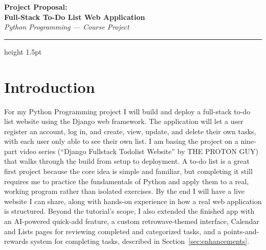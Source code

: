 \documentclass[11pt]{article}
\begin{document}
\begin{flushleft}
{\Huge\bfseries\color{headblue} Project Proposal:\\[2pt] Full-Stack To-Do List Web Application}\\[4pt]
{\itshape\color{gray} Python Programming --- Course Project}
\end{flushleft}
\vspace{2pt}
{\color{rowblue}\hrule height 1.5pt}
\vspace{8pt}

\section{Introduction}
For my Python Programming project I will build and deploy a full-stack to-do list website using the Django web framework. The application will let a user register an account, log in, and create, view, update, and delete their own tasks, with each user only able to see their own list. I am basing the project on a nine-part video series (``Django Fullstack Todolist Website'' by THE PROTON GUY) that walks through the build from setup to deployment. A to-do list is a great first project because the core idea is simple and familiar, but completing it still requires me to practice the fundamentals of Python and apply them to a real, working program rather than isolated exercises. By the end I will have a live website I can share, along with hands-on experience in how a real web application is structured. Beyond the tutorial's scope, I also extended the finished app with an AI-powered quick-add feature, a custom retrowave-themed interface, Calendar and Lists pages for reviewing completed and categorized tasks, and a points-and-rewards system for completing tasks, described in Section~\ref{sec:enhancements}.
\end{document}
